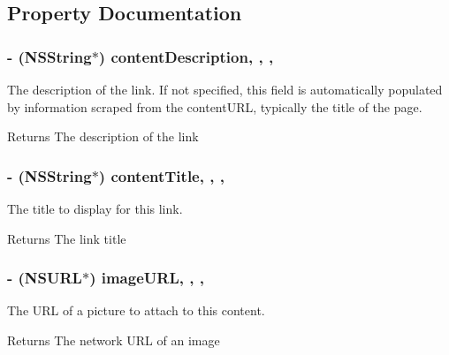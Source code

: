 \subsection{Property Documentation}
\hypertarget{interface_f_b_s_d_k_share_link_content_a1fef92d83f1e0a9f51c0923fd820ec41}{
\subsubsection[{content\-Description}]{\setlength{\rightskip}{0pt plus 5cm}-\/ (N\-S\-String$\ast$) content\-Description\hspace{0.3cm}{\ttfamily [read]}, {\ttfamily [write]}, {\ttfamily [nonatomic]}, {\ttfamily [copy]}}}\label{interface_f_b_s_d_k_share_link_content_a1fef92d83f1e0a9f51c0923fd820ec41}
The description of the link.  If not specified, this field is automatically populated by information scraped from the content\-U\-R\-L, typically the title of the page. \begin{DoxyReturn}{Returns}
The description of the link 
\end{DoxyReturn}
\hypertarget{interface_f_b_s_d_k_share_link_content_acad99ec961a251713ec7118356ed6a2a}{
\subsubsection[{content\-Title}]{\setlength{\rightskip}{0pt plus 5cm}-\/ (N\-S\-String$\ast$) content\-Title\hspace{0.3cm}{\ttfamily [read]}, {\ttfamily [write]}, {\ttfamily [nonatomic]}, {\ttfamily [copy]}}}\label{interface_f_b_s_d_k_share_link_content_acad99ec961a251713ec7118356ed6a2a}
The title to display for this link. \begin{DoxyReturn}{Returns}
The link title 
\end{DoxyReturn}
\hypertarget{interface_f_b_s_d_k_share_link_content_a7eb946e85589c6436ed65bf8f4166172}{
\subsubsection[{image\-U\-R\-L}]{\setlength{\rightskip}{0pt plus 5cm}-\/ (N\-S\-U\-R\-L$\ast$) image\-U\-R\-L\hspace{0.3cm}{\ttfamily [read]}, {\ttfamily [write]}, {\ttfamily [nonatomic]}, {\ttfamily [copy]}}}\label{interface_f_b_s_d_k_share_link_content_a7eb946e85589c6436ed65bf8f4166172}
The U\-R\-L of a picture to attach to this content. \begin{DoxyReturn}{Returns}
The network U\-R\-L of an image 
\end{DoxyReturn}


